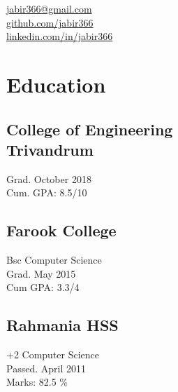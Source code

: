 \documentclass[11pt]{hieudo-build}
\begin{document}
%
%
{                                                                
    \faEnvelope \href{mailto:jabir366@gmail.com}{ jabir366@gmail.com}\\          
    \faGithub \href{https://github.com/jabir366}{   github.com/jabir366}\\      
    \faLinkedinSquare \href{https://www.linkedin.com/in/jabir366}{   linkedin.com/in/jabir366} \\
}   
%
%
\begin{minipage}[t]{0.34\textwidth} 

\section{Education} 
\subsection{College of Engineering \\ Trivandrum}                    
Grad. October 2018 \\                                               
Cum. GPA: 8.5/10\\                                                  
\sectionsep                                                         
\subsection{Farook College}  
Bsc Computer Science\\
Grad. May 2015 \\                                                   
Cum GPA: 3.3/4\\                                                    
\sectionsep     
\subsection{Rahmania HSS}
+2 Computer Science \\
Passed. April 2011 \\
Marks: 82.5 \%

\end{minipage}
\end{document}
